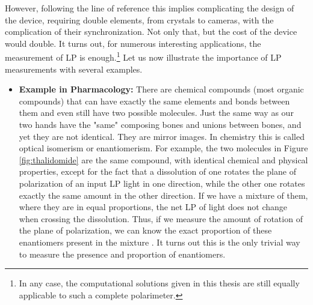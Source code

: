 \documentclass[11pt, a4paper, twoside]{article} %
\begin{document}
However, following the line of reference \cite{incomplete} this implies complicating the design of the device, requiring double elements, from crystals to cameras, with the complication of their synchronization. Not only that, but the cost of the device would double. It turns out, for numerous interesting applications, the measurement of LP is enough.\footnote{In any case, the computational solutions given in this thesis are still equally applicable to such a complete polarimeter.} Let us now illustrate the importance of LP measurements with several examples. 
\begin{itemize}

\item{\bf Example in Pharmacology: }There are chemical compounds (most organic compounds) that can have exactly the same elements and bonds between them and even still have two possible molecules. Just the same way as our two hands have the "same" composing bones and unions between bones, and yet they are not identical. They are mirror images. In chemistry this is called optical isomerism or enantiomerism. For example, the two molecules in Figure \ref{fig:thalidomide} are the same compound, with identical chemical and physical properties, except for the fact that a dissolution of one rotates the plane of polarization of an input LP light in one direction, while the other one rotates exactly the same amount in the other direction. If we have a mixture of them, where they are in equal proportions, the net LP of light does not change when crossing the dissolution. Thus, if we measure the amount of rotation of the plane of polarization, we can know the exact proportion of these enantiomers present in the mixture \cite{enantiomers}. It turns out this is the only trivial way to measure the presence and proportion of enantiomers. 


\end{itemize}
\end{document}
